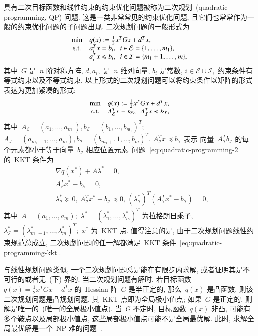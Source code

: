 
具有二次目标函数和线性约束的约束优化问题被称为二次规划~(quadratic programming, QP) 问题. 这是一类非常常见的约束优化问题, 且它们也常常作为一般的约束优化问题的子问题出现. 二次规划问题的一般形式为
\begin{equation}
\label{eq:quadratic-programming-1}
\begin{array}{cl}
\min & q({x}) := \frac{1}{2} {x}^T G {x} + {d}^T {x}, \\
{\rm s.t.} & {a}_i^T {x} = b_i, ~~ i \in \mathcal{E} = \{1, \ldots, m_1\}, \\
& {a}_i^T {x} \leqslant b_i, ~~ i \in \mathcal{I} = \{m_1 + 1, \ldots, m\},
\end{array}
\end{equation}
其中~$G$ 是~$n$ 阶对称方阵, ${d}, {a}_i,$ 是~$n$ 维列向量, $b_i$ 是常数, $i \in \mathcal{E} \cup \mathcal{I},$ 约束条件有等式约束以及不等式约束. 以上形式的二次规划问题可以将约束条件以矩阵的形式表达为更加紧凑的形式:
\begin{equation}
\label{eq:quadratic-programming-2}
\begin{array}{cl}
\min & q({x}) := \frac{1}{2} {x}^T G {x} + {d}^T {x}, \\
{\rm s.t.} & A^T_{\mathcal{E}} {x} = {b}_{\mathcal{E}}, ~~ A^T_{\mathcal{I}} x \preccurlyeq {b}_{\mathcal{I}},
\end{array}
\end{equation}
其中~$A_{\mathcal{E}} = ({a}_1, \ldots, {a}_{m_1}), {b}_{\mathcal{E}} = (b_1, \ldots, b_{m_1})^T;$ $A_{\mathcal{I}} = ({a}_{m_1+1}, \ldots, {a}_m), {b}_{\mathcal{I}} = (b_{m_1+1}1, \ldots, b_m)^T.$ $A^T_{\mathcal{I}} {x} \preccurlyeq {b}_{\mathcal{I}}$ 表示
向量~$A^T_{\mathcal{I}} {b}_{\mathcal{I}}$ 的每个元素都小于等于向量~${b}_{\mathcal{I}}$ 相应位置元素. 问题~\eqref{eq:quadratic-programming-2} 的~KKT 条件为
\begin{equation}
\label{eq:quadratic-programming-kkt}
\begin{aligned}
& \nabla q({x}^*) + A {\lambda}^* = {0}, \\
& A^T_{\mathcal{E}} {x}^* - {b}_{\mathcal{E}} = {0}, \\
& {\lambda}^*_{\mathcal{I}} \succcurlyeq {0}, ~ A_{\mathcal{I}}^T {x}^* - {b}_{\mathcal{I}} \preccurlyeq {0}, ~ ({\lambda}^*_{\mathcal{I}})^T (A_{\mathcal{I}}^T {x}^* - {b}_{\mathcal{I}}) = {0},
\end{aligned}
\end{equation}
其中~$A = ({a}_1, \ldots, {a}_m);$ ${\lambda}^* = (\lambda_1^*, \ldots, \lambda_m^*)^T$ 为拉格朗日乘子, ${\lambda}^*_{\mathcal{I}} = (\lambda_{m_1+1}^*, \ldots, \lambda_m^*)^T;$ ${x}^*$ 为~KKT 点. 值得注意的是, 由于二次规划问题线性约束规范总成立, 二次规划问题的任一解都满足~KKT 
条件~\eqref{eq:quadratic-programming-kkt}.

与线性规划问题类似, 一个二次规划问题总是能在有限步内求解, 或者证明其是不可行的或者无~(下) 界的. 当二次规划问题有解时, 若目标函数~$q({x}) = \frac{1}{2} {x}^T G {x} + {d}^T {x}$ 的~Hessian 阵~$G$ 是半正定的, 那么~$q({x})$ 是凸函数, 则该二次规划问题是凸规划问题, 其~KKT 点即为全局极小值点; 如果~$G$ 是正定的, 则解是唯一的~(唯一的全局极小值点). 当~$G$ 不定时, 目标函数~$q({x})$ 非凸, 可能有多个鞍点以及局部极小值点, 这些局部极小值点可能不是全局最优解. 此时, 求解全局最优解是一个~NP-难的问题~\cite{Murty_1987}.
